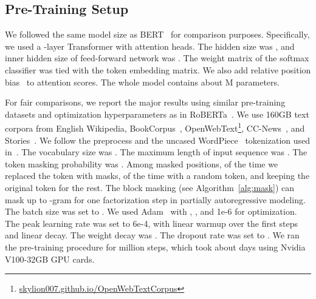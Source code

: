 \documentclass{article}
\newcommand{\bertbase}{BERT}
\newcommand{\robertabase}{RoBERTa}
\begin{document}
\subsection{Pre-Training Setup}
\label{sec:pretrain:setup}

We followed the same model size as \bertbase{}~\cite{bert} for comparison purposes.
Specifically, we used a -layer Transformer with  attention heads.
The hidden size was , and inner hidden size of feed-forward network was .
The weight matrix of the softmax classifier was tied with the token embedding matrix.
We also add relative position bias~\cite{t5} to attention scores.
The whole model contains about M parameters.

For fair comparisons, we report the major results using similar pre-training datasets and optimization hyperparameters as in \robertabase{}~\cite{roberta}.
We use 160GB text corpora from English Wikipedia, BookCorpus~\cite{bookcorpus}, OpenWebText\footnote{\url{skylion007.github.io/OpenWebTextCorpus}}, CC-News~\cite{roberta}, and Stories~\cite{stories_data}.
We follow the preprocess and the uncased WordPiece~\cite{gnmt} tokenization used in~\cite{bert}.
The vocabulary size was . The maximum length of input sequence was . The token masking probability was .
Among masked positions,  of the time we replaced the token with masks,  of the time with a random token, and keeping the original token for the rest.
The block masking (see Algorithm~\ref{alg:mask}) can mask up to -gram for one factorization step in partially autoregressive modeling.
The batch size was set to .
We used Adam~\cite{adam} with , , and  1e-6 for optimization.
The peak learning rate was set to 6e-4, with linear warmup over the first  steps and linear decay.
The weight decay was . The dropout rate was set to .
We ran the pre-training procedure for  million steps, which took about  days using  Nvidia V100-32GB GPU cards.
\end{document}
